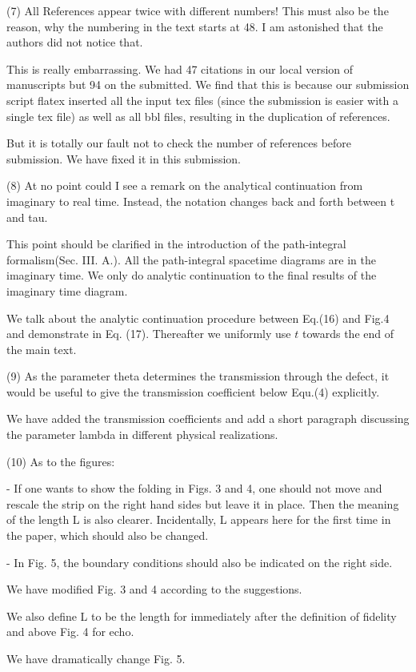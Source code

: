 \documentclass{article}
\newcommand{\reply}[1]{{\color{black}#1}}
\begin{document}
(7) All References appear twice with different numbers! This must also be the reason, why the numbering in the text starts at 48. I am astonished that the authors did not notice that.

\reply{This is really embarrassing. We had 47 citations in our local version of manuscripts but 94 on the submitted. We find that this is because our submission script flatex inserted all the input tex files (since the submission is easier with a single tex file) as well as all bbl files, resulting in the duplication of references. 

But it is totally our fault not to check the number of references before submission. We have fixed it in this submission. }

(8) At no point could I see a remark on the analytical continuation from imaginary to real time. Instead, the notation changes back and forth between t and tau.

\reply{This point should be clarified in the introduction of the path-integral formalism(Sec. III. A.). All the path-integral spacetime diagrams are in the imaginary time. We only do analytic continuation to the final results of the imaginary time diagram.

We talk about the analytic continuation procedure between Eq.(16) and Fig.4 and demonstrate in Eq. (17). Thereafter we uniformly use $t$ towards the end of the main text.}

(9) As the parameter theta determines the transmission through the defect, it would be useful to give the transmission coefficient below Equ.(4) explicitly.

\reply{We have added the transmission coefficients and add a short paragraph discussing the parameter lambda in different physical realizations.}

(10) As to the figures:

- If one wants to show the folding in Figs. 3 and 4, one should not move and rescale the strip on the right hand sides but leave it in place. Then the meaning of the length L is also clearer. Incidentally, L appears here for the first time in the paper, which should also be changed.

- In Fig. 5, the boundary conditions should also be indicated on the right side.

\reply{We have modified Fig. 3 and 4 according to the suggestions. 

We also define L to be the length for immediately after the definition of fidelity and above Fig. 4 for echo. 

We have dramatically change Fig. 5. 
}
\end{document}
